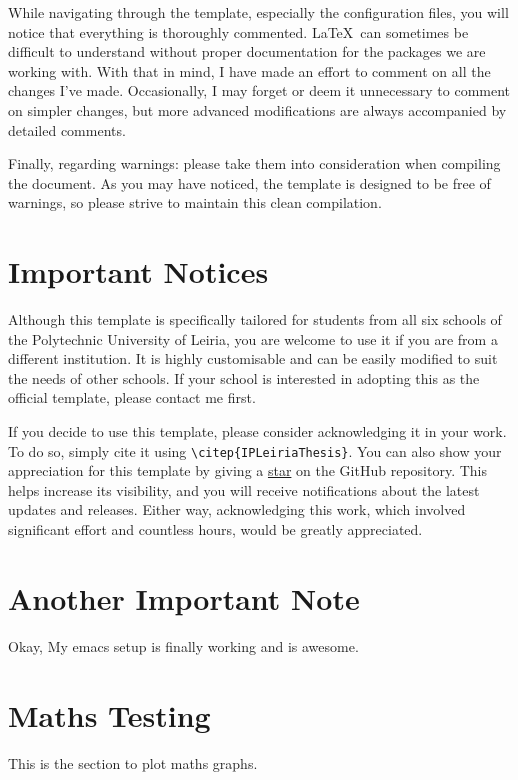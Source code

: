 While navigating through the template, especially the configuration files, you will notice that everything is thoroughly commented. \LaTeX~can sometimes be difficult to understand without proper documentation for the packages we are working with. With that in mind, I have made an effort to comment on all the changes I’ve made. Occasionally, I may forget or deem it unnecessary to comment on simpler changes, but more advanced modifications are always accompanied by detailed comments.

Finally, regarding warnings: please take them into consideration when compiling the document. As you may have noticed, the template is designed to be free of warnings, so please strive to maintain this clean compilation.

\section{Important Notices}
Although this template is specifically tailored for students from all six schools of the Polytechnic University of Leiria, you are welcome to use it if you are from a different institution. It is highly customisable and can be easily modified to suit the needs of other schools. If your school is interested in adopting this as the official template, please contact me first.

If you decide to use this template, please consider acknowledging it in your work. To do so, simply cite it using \verb|\citep{IPLeiriaThesis}|. You can also show your appreciation for this template by giving a \href{https://github.com/joseareia/ipleiria-thesis/stargazers}{star} on the GitHub repository. This helps increase its visibility, and you will receive notifications about the latest updates and releases. Either way, acknowledging this work, which involved significant effort and countless hours, would be greatly appreciated.

\section{Another Important Note}
Okay, My emacs setup is finally working and is awesome.

\newpage

\section{Maths Testing}
This is the section to plot maths graphs.

\vspace{10pt}


